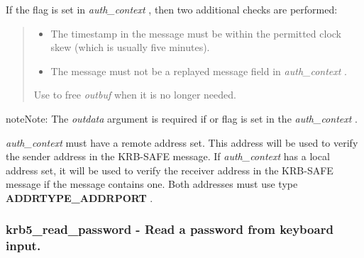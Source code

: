 \documentclass[letterpaper,10pt,english]{sphinxmanual}
\begin{document}
If the {\hyperref[appdev/refs/macros/KRB5_AUTH_CONTEXT_DO_TIME:KRB5_AUTH_CONTEXT_DO_TIME]{}} flag is set in \emph{auth\_context} , then two additional checks are performed:
\begin{quote}
\begin{itemize}
\item {} 
The timestamp in the message must be within the permitted clock skew (which is usually five minutes).

\item {} 
The message must not be a replayed message field in \emph{auth\_context} .

\end{itemize}

Use {\hyperref[appdev/refs/api/krb5_free_data_contents:krb5_free_data_contents]{}} to free \emph{outbuf} when it is no longer needed.
\end{quote}

\begin{notice}{note}{Note:}
The \emph{outdata} argument is required if {\hyperref[appdev/refs/macros/KRB5_AUTH_CONTEXT_RET_TIME:KRB5_AUTH_CONTEXT_RET_TIME]{}} or {\hyperref[appdev/refs/macros/KRB5_AUTH_CONTEXT_RET_SEQUENCE:KRB5_AUTH_CONTEXT_RET_SEQUENCE]{}} flag is set in the \emph{auth\_context} .

\emph{auth\_context} must have a remote address set. This address will be used to verify the sender address in the KRB-SAFE message. If \emph{auth\_context} has a local address set, it will be used to verify the receiver address in the KRB-SAFE message if the message contains one. Both addresses must use type \textbf{ADDRTYPE\_ADDRPORT} .
\end{notice}


\subsubsection{krb5\_read\_password -  Read a password from keyboard input.}
\label{appdev/refs/api/krb5_read_password:krb5-read-password-read-a-password-from-keyboard-input}\label{appdev/refs/api/krb5_read_password::doc}

\begin{fulllineitems}
\label{appdev/refs/api/krb5_read_password:krb5_read_password}
\end{fulllineitems}
\end{document}
